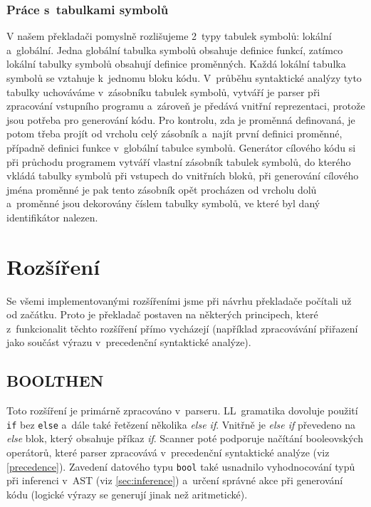 \documentclass[11pt]{article}
\begin{document}
\subsubsection{Práce s~tabulkami symbolů}

V našem překladači pomyslně rozlišujeme 2~typy tabulek symbolů: lokální a~globální. Jedna globální tabulka symbolů obsahuje definice funkcí, zatímco lokální tabulky symbolů obsahují definice proměnných. Každá lokální tabulka symbolů se vztahuje k~jednomu bloku kódu. V~průběhu syntaktické analýzy tyto tabulky uchováváme v~zásobníku tabulek symbolů, vytváří je parser při zpracování vstupního programu a~zároveň je předává vnitřní reprezentaci, protože jsou potřeba pro generování kódu. Pro kontrolu, zda je proměnná definovaná, je potom třeba projít od vrcholu celý zásobník a~najít první definici proměnné, případně definici funkce v~globální tabulce symbolů. Generátor cílového kódu si při průchodu programem vytváří vlastní zásobník tabulek symbolů, do kterého vkládá tabulky symbolů při vstupech do vnitřních bloků, při generování cílového jména proměnné je pak tento zásobník opět procházen od vrcholu dolů a~proměnné jsou dekorovány číslem tabulky symbolů, ve které byl daný identifikátor nalezen.

\section{Rozšíření}

Se všemi implementovanými rozšířeními jsme při návrhu překladače počítali už od začátku. Proto je překladač postaven na některých principech, které z~funkcionalit těchto rozšíření přímo vycházejí (například zpracovávání přiřazení jako součást výrazu v~precedenční syntaktické analýze).

\subsection{BOOLTHEN}
Toto rozšíření je primárně zpracováno v~parseru. LL~gramatika dovoluje použití \texttt{if} bez \texttt{else} a~dále také řetězení několika \textit{else if}. Vnitřně je \textit{else if} převedeno na \textit{else} blok, který obsahuje příkaz \textit{if}. Scanner poté podporuje načítání booleovských operátorů, které parser zpracovává v~precedenční syntaktické analýze (viz \ref{precedence}). Zavedení datového typu \texttt{bool} také usnadnilo vyhodnocování typů při inferenci v~AST (viz \ref{sec:inference}) a~určení správné akce při generování kódu (logické výrazy se generují jinak než aritmetické).
\end{document}
